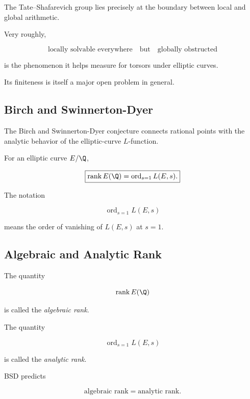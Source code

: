 The Tate--Shafarevich group lies precisely at the boundary between local and
global arithmetic.

Very roughly,

\[
\boxed{
\text{locally solvable everywhere}
\quad\text{but}\quad
\text{globally obstructed}
}
\]

is the phenomenon it helps measure for torsors under elliptic curves.

Its finiteness is itself a major open problem in general.

\subsection{Birch and Swinnerton-Dyer}
\label{subsec:bsd-arithmetic-geometry}

The Birch and Swinnerton-Dyer conjecture connects rational points with the
analytic behavior of the elliptic-curve \(L\)-function.

\begin{conjecture}
For an elliptic curve \(E/\Q\),

\[ \boxed{\operatorname{rank}E(\Q)=\operatorname{ord}_{s=1}L(E,s).} \]
\end{conjecture}

The notation

\[ \operatorname{ord}_{s=1}L(E,s) \]

means the order of vanishing of \(L(E,s)\) at \(s=1\).

\subsection{Algebraic and Analytic Rank}
\label{subsec:algebraic-analytic-rank}

The quantity

\[ \operatorname{rank}E(\Q) \]

is called the \emph{algebraic rank}.

The quantity

\[ \operatorname{ord}_{s=1}L(E,s) \]

is called the \emph{analytic rank}.

BSD predicts

\[ \boxed{\text{algebraic rank}=\text{analytic rank}.} \]

